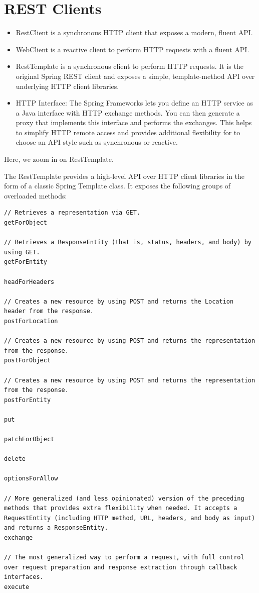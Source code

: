 \documentclass{scrartcl}
\begin{document}
\section{REST Clients}

\begin{itemize}
    \item RestClient is a synchronous HTTP client that exposes a modern, fluent API.
    \item WebClient is a reactive client to perform HTTP requests with a fluent API.
    \item RestTemplate is a synchronous client to perform HTTP requests. It is the original Spring REST client and exposes a simple, template-method API over underlying HTTP client libraries.
    \item HTTP Interface: The Spring Frameworks lets you define an HTTP service as a Java interface with HTTP exchange methods. You can then generate a proxy that implements this interface and performs the exchanges. This helps to simplify HTTP remote access and provides additional flexibility for to choose an API style such as synchronous or reactive.
\end{itemize}

Here, we zoom in on RestTemplate.

The RestTemplate provides a high-level API over HTTP client libraries in the form of a classic Spring Template class. It exposes the following groups of overloaded methods:

\begin{lstlisting}
// Retrieves a representation via GET.
getForObject

// Retrieves a ResponseEntity (that is, status, headers, and body) by using GET.
getForEntity

headForHeaders

// Creates a new resource by using POST and returns the Location header from the response.
postForLocation

// Creates a new resource by using POST and returns the representation from the response.
postForObject

// Creates a new resource by using POST and returns the representation from the response.
postForEntity

put

patchForObject

delete

optionsForAllow

// More generalized (and less opinionated) version of the preceding methods that provides extra flexibility when needed. It accepts a RequestEntity (including HTTP method, URL, headers, and body as input) and returns a ResponseEntity.
exchange

// The most generalized way to perform a request, with full control over request preparation and response extraction through callback interfaces.
execute
\end{lstlisting}
\end{document}
